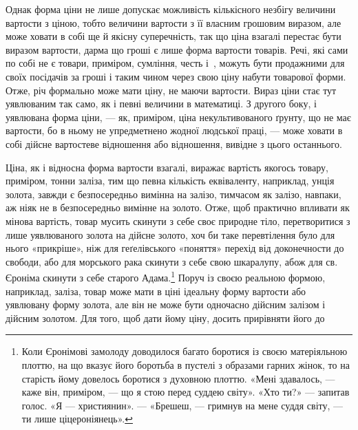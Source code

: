Однак форма ціни не лише допускає можливість кількісного
незбігу величини вартости з ціною, тобто величини вартости
з її власним грошовим виразом, але може ховати в собі ще й
якісну суперечність, так що ціна взагалі перестає бути виразом
вартости, дарма що гроші є лише форма вартости товарів. Речі,
які сами по собі не є товари, приміром, сумління, честь і~,
можуть бути продажними для своїх посідачів за гроші і таким
чином через свою ціну набути товарової форми. Отже, річ формально
може мати ціну, не маючи вартости. Вираз ціни стає тут
уявлюваним так само, як і певні величини в математиці. З другого
боку, і уявлювана форма ціни, — як, приміром, ціна некультивованого
ґрунту, що не має вартости, бо в ньому не упредметнено
жодної людської праці, — може ховати в собі дійсне вартостеве
відношення або відношення, вивідне з цього останнього.

Ціна, як і відносна форма вартости взагалі, виражає вартість
якогось товару, приміром, тонни заліза, тим що певна кількість
еквіваленту, наприклад, унція золота, завжди є безпосередньо
вимінна на залізо, тимчасом як залізо, навпаки, аж ніяк не в
безпосередньо вимінне на золото. Отже, щоб практично впливати
як мінова вартість, товар мусить скинути з себе своє природне
тіло, перетворитися з лише уявлюваного золота на дійсне
золото, хоч би таке перевтілення було для нього «прикріше»,
ніж для геґелівського «поняття» перехід від доконечности до
свободи, або для морського рака скинути з себе свою шкаралупу,
абож для св. Єроніма скинути з себе старого Адама.\footnote{
Коли Єронімові замолоду доводилося багато боротися із своєю
матеріяльною плоттю, на що вказує його боротьба в пустелі з образами
гарних жінок, то на старість йому довелось боротися з духовною плоттю.
«Мені здавалось, — каже він, приміром, — що я стою перед суддею світу».
«Хто ти?» — запитав голос. «Я — християнин». — «Брешеш, — гримнув
на мене суддя світу, — ти лише ціцероніянець».
} Поруч
із своєю реальною формою, наприклад, заліза, товар може мати
в ціні ідеальну форму вартости або уявлювану форму золота,
але він не може бути одночасно дійсним залізом і дійсним золотом.
Для того, щоб дати йому ціну, досить прирівняти його до
\parbreak{}  %
